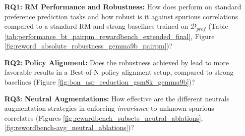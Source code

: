 \label{list:research_questions}
\begin{itemize}[left=18pt,itemsep=2pt, topsep=0pt, parsep=2pt]
    \item[\textbf{RQ1:}] \textbf{RM Performance and Robustness:} How does \carma{} perform on standard preference prediction tasks and how robust is it against spurious correlations compared to a standard RM and strong baselines trained on $\mathcal{D}_{pref}$ (Table \ref{tab:performance_bt_pairpm_rewardbench_extended_final}, Figure \ref{fig:reword_absolute_robustness_gemma9b_pairpm})?    

    \item[\textbf{RQ2:}] \textbf{Policy Alignment:} Does the robustness achieved by \carma{} lead to more favorable results in a Best-of-N policy alignment setup, compared to strong baselines (Figure \ref{fig:bon_asr_reduction_gsm8k_gemma9b})?  
    
    \item[\textbf{RQ3:}] \textbf{Neutral Augmentations:} How effective are the different neutrals augmentation strategies in enforcing \textit{invariance} to unknown spurious correlates (Figures \ref{fig:rewardbench_subsets_neutral_ablations}, \ref{fig:rewordbench-avg_neutral_ablations})?
\end{itemize}





